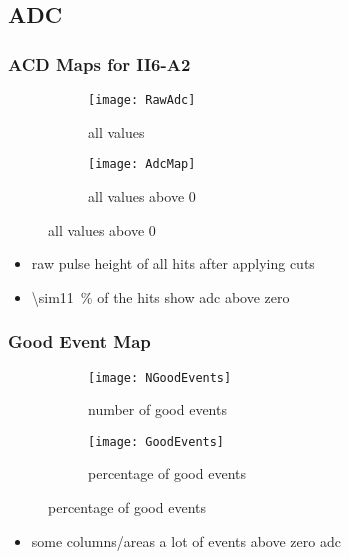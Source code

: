 \subsection{ADC}
\begin{frame}
	\frametitle{ACD Maps for II6-A2}
	\begin{figure} 
		\begin{center}
			\begin{subfigure}{0.45\textwidth}  
				\centering 
				\texttt{[image: RawAdc]}
				\caption{all values}
			\end{subfigure}
			\begin{subfigure}{0.45\textwidth} 
				\centering 
				\texttt{[image: AdcMap]}
				\caption{all values above 0}
			\end{subfigure} 
		\end{center}
	\end{figure}
	\begin{itemize}
		\item raw pulse height of all hits after applying cuts
		\item \SI{\sim11}{\%} of the hits show adc above zero
	\end{itemize}
\end{frame}
\begin{frame}
	\frametitle{Good Event Map}
	\begin{figure} 
		\begin{center}
			\begin{subfigure}{0.45\textwidth}  
				\centering 
				\texttt{[image: NGoodEvents]}
				\caption{number of good events}
			\end{subfigure}
			\begin{subfigure}{0.45\textwidth} 
				\centering 
				\texttt{[image: GoodEvents]}
				\caption{percentage of good events}
			\end{subfigure} 
		\end{center}
	\end{figure}
	\begin{itemize}
		\item some columns/areas a lot of events above zero adc
	\end{itemize}
\end{frame}
